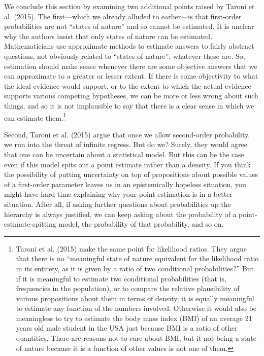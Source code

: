 \documentclass[
  10pt,
  dvipsnames,enabledeprecatedfontcommands]{scrartcl}
\begin{document}
We conclude this section by examining two additional points raised by
Taroni et al. (2015). The first---which we already alluded to
earlier---is that first-order probabilities are not ``states of nature''
and so cannot be estimated. It is unclear why the authors insist that
only states of nature can be estimated. Mathematicians use approximate
methods to estimate answers to fairly abstract questions, not obviously
related to ``states of nature'', whatever these are. So, estimation
should make sense whenever there are some objective answers that we can
approximate to a greater or lesser extent. If there is some objectivity
to what the ideal evidence would support, or to the extent to which the
actual evidence supports various competing hypotheses, we can be more or
less wrong about such things, and so it is not implausible to say that
there is a clear sense in which we can estimate them.\footnote{Taroni et
  al. (2015) make the same point for likelihood ratios. They argue that
  there is no ``meaningful state of nature equivalent for the likelihood
  ratio in its entirety, as it is given by a ratio of two conditional
  probabilities?'' But if it is meaningful to estimate two conditional
  probabilities (that is, frequencies in the population), or to compare
  the relative plausibility of various propositions about them in terms
  of density, it is equally meaningful to estimate any function of the
  numbers involved. Otherwise it would also be meaningless to try to
  estimate the body mass index (BMI) of an average 21 years old male
  student in the USA just because BMI is a ratio of other quantities.
  There are reasons not to care about BMI, but it not being a state of
  nature because it is a function of other values is not one of them.}


Second, Taroni et al. (2015) argue that once we allow second-order
probability, we run into the threat of infinite regress. But do we?
Surely, they would agree that one can be uncertain about a statistical
model. But this can be the case even if this model spits out a point
estimate rather than a density. If you think the possibility of putting
uncertainty on top of propositions about possible values of a
first-order parameter leaves us in an epistemically hopeless situation,
you might have hard time explaining why your point estimation is in a
better situation. After all, if asking further questions about
probabilities up the hierarchy is always justified, we can keep asking
about the probability of a point-estimate-spitting model, the
probability of that probability, and so on.
\end{document}

